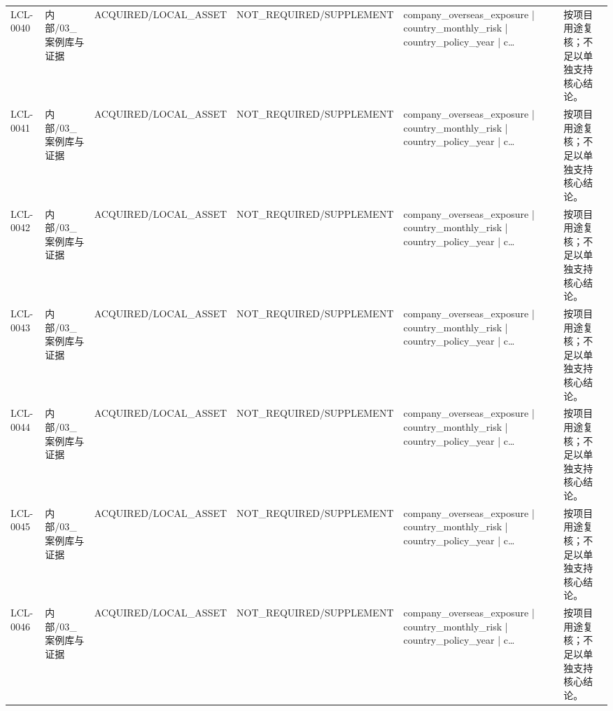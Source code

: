\begin{landscape}
\begin{longtable}{p{1.8cm}p{2.6cm}p{2.6cm}p{2.6cm}p{4.8cm}p{7.2cm}}
LCL-0040 & 内部/\allowbreak{}03\_\allowbreak{}案例库与证据 & ACQUIRED/\allowbreak{}LOCAL\_\allowbreak{}ASSET & NOT\_\allowbreak{}REQUIRED/\allowbreak{}SUPPLEMENT & company\_\allowbreak{}overseas\_\allowbreak{}exposure | country\_\allowbreak{}monthly\_\allowbreak{}risk | country\_\allowbreak{}policy\_\allowbreak{}year | c… & 按项目用途复核；不足以单独支持核心结论。\\
LCL-0041 & 内部/\allowbreak{}03\_\allowbreak{}案例库与证据 & ACQUIRED/\allowbreak{}LOCAL\_\allowbreak{}ASSET & NOT\_\allowbreak{}REQUIRED/\allowbreak{}SUPPLEMENT & company\_\allowbreak{}overseas\_\allowbreak{}exposure | country\_\allowbreak{}monthly\_\allowbreak{}risk | country\_\allowbreak{}policy\_\allowbreak{}year | c… & 按项目用途复核；不足以单独支持核心结论。\\
LCL-0042 & 内部/\allowbreak{}03\_\allowbreak{}案例库与证据 & ACQUIRED/\allowbreak{}LOCAL\_\allowbreak{}ASSET & NOT\_\allowbreak{}REQUIRED/\allowbreak{}SUPPLEMENT & company\_\allowbreak{}overseas\_\allowbreak{}exposure | country\_\allowbreak{}monthly\_\allowbreak{}risk | country\_\allowbreak{}policy\_\allowbreak{}year | c… & 按项目用途复核；不足以单独支持核心结论。\\
LCL-0043 & 内部/\allowbreak{}03\_\allowbreak{}案例库与证据 & ACQUIRED/\allowbreak{}LOCAL\_\allowbreak{}ASSET & NOT\_\allowbreak{}REQUIRED/\allowbreak{}SUPPLEMENT & company\_\allowbreak{}overseas\_\allowbreak{}exposure | country\_\allowbreak{}monthly\_\allowbreak{}risk | country\_\allowbreak{}policy\_\allowbreak{}year | c… & 按项目用途复核；不足以单独支持核心结论。\\
LCL-0044 & 内部/\allowbreak{}03\_\allowbreak{}案例库与证据 & ACQUIRED/\allowbreak{}LOCAL\_\allowbreak{}ASSET & NOT\_\allowbreak{}REQUIRED/\allowbreak{}SUPPLEMENT & company\_\allowbreak{}overseas\_\allowbreak{}exposure | country\_\allowbreak{}monthly\_\allowbreak{}risk | country\_\allowbreak{}policy\_\allowbreak{}year | c… & 按项目用途复核；不足以单独支持核心结论。\\
LCL-0045 & 内部/\allowbreak{}03\_\allowbreak{}案例库与证据 & ACQUIRED/\allowbreak{}LOCAL\_\allowbreak{}ASSET & NOT\_\allowbreak{}REQUIRED/\allowbreak{}SUPPLEMENT & company\_\allowbreak{}overseas\_\allowbreak{}exposure | country\_\allowbreak{}monthly\_\allowbreak{}risk | country\_\allowbreak{}policy\_\allowbreak{}year | c… & 按项目用途复核；不足以单独支持核心结论。\\
LCL-0046 & 内部/\allowbreak{}03\_\allowbreak{}案例库与证据 & ACQUIRED/\allowbreak{}LOCAL\_\allowbreak{}ASSET & NOT\_\allowbreak{}REQUIRED/\allowbreak{}SUPPLEMENT & company\_\allowbreak{}overseas\_\allowbreak{}exposure | country\_\allowbreak{}monthly\_\allowbreak{}risk | country\_\allowbreak{}policy\_\allowbreak{}year | c… & 按项目用途复核；不足以单独支持核心结论。\\

\end{longtable}
\end{landscape}
